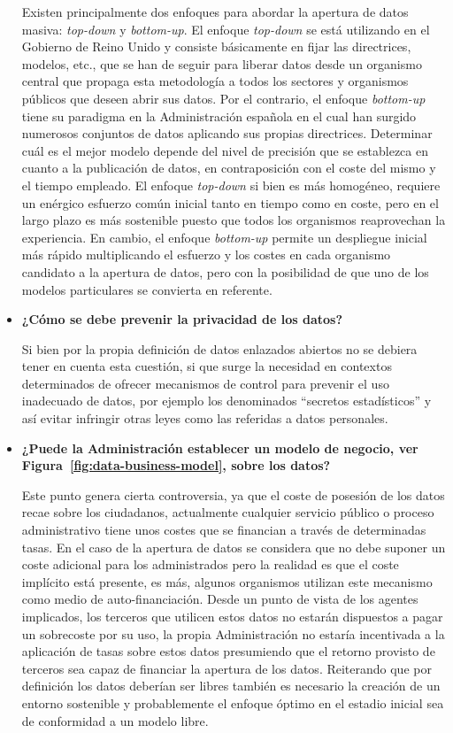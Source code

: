 \begin{itemize}
Existen principalmente dos enfoques para abordar la apertura de datos masiva: \textit{top-down} y \textit{bottom-up}. El enfoque \textit{top-down} se está
utilizando en el Gobierno de Reino Unido y consiste básicamente en fijar las directrices, modelos, etc., que se han de seguir para liberar
datos desde un organismo central que propaga esta metodología a todos los sectores y organismos públicos que deseen abrir sus datos. Por el contrario,
el enfoque \textit{bottom-up} tiene su paradigma en la Administración española en el cual han surgido numerosos conjuntos de datos aplicando
sus propias directrices. Determinar cuál es el mejor modelo depende del nivel de precisión que se establezca en cuanto a la publicación de datos, en contraposición
con el coste del mismo y el tiempo empleado. El enfoque \textit{top-down} si bien es más homogéneo, requiere un enérgico esfuerzo común inicial tanto en tiempo
como en coste, pero en el largo plazo es más sostenible puesto que todos los organismos reaprovechan la experiencia. En cambio, el enfoque \textit{bottom-up} permite
un despliegue inicial más rápido multiplicando el esfuerzo y los costes en cada organismo candidato a la apertura de datos, pero 
con la posibilidad de que uno de los modelos particulares se convierta en referente.


\item \textbf{¿Cómo se debe prevenir la privacidad de los datos?} 

Si bien por la propia definición de datos enlazados abiertos no se debiera tener en cuenta esta cuestión, si que surge la necesidad en contextos determinados de ofrecer mecanismos de control para prevenir el uso inadecuado
de datos, por ejemplo los denominados ``secretos estadísticos'' y así evitar infringir otras leyes como las referidas a datos personales.

\item \textbf{¿Puede la Administración establecer un modelo de negocio, ver Figura~\ref{fig:data-business-model}, sobre los datos?}


Este punto genera cierta controversia, ya que el coste de posesión de los datos recae sobre los ciudadanos, actualmente cualquier servicio público o proceso administrativo tiene unos costes que se financian
a través de determinadas tasas. En el caso de la apertura de datos se considera que no debe suponer un coste adicional para los administrados
pero la realidad es que el coste implícito está presente, es más, algunos organismos utilizan este mecanismo como medio de auto-financiación. Desde un punto
de vista de los agentes implicados, los terceros que utilicen estos datos no estarán dispuestos a pagar un sobrecoste por su uso, la propia Administración
no estaría incentivada a la aplicación de tasas sobre estos datos presumiendo que el retorno provisto de terceros sea capaz de financiar la apertura de los datos. Reiterando que 
por definición los datos deberían ser libres también es necesario la creación de un entorno sostenible y probablemente el enfoque óptimo en el 
estadio inicial sea de conformidad a un modelo libre.


\end{itemize}

